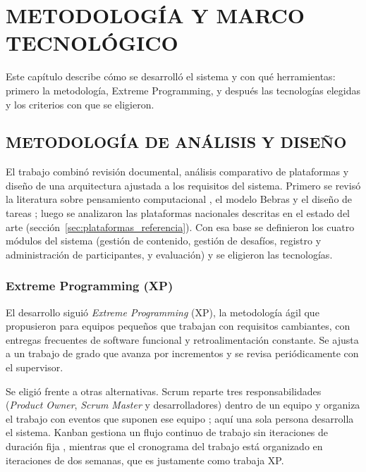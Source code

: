 \chapter{METODOLOGÍA Y MARCO TECNOLÓGICO}

Este capítulo describe cómo se desarrolló el sistema y con qué herramientas: primero la metodología, Extreme Programming, y después las tecnologías elegidas y los criterios con que se eligieron.

\section{METODOLOGÍA DE ANÁLISIS Y DISEÑO}

El trabajo combinó revisión documental, análisis comparativo de plataformas y diseño de una arquitectura ajustada a los requisitos del sistema. Primero se revisó la literatura sobre pensamiento computacional \parencite{wing2006,grover2013}, el modelo Bebras \parencite{dagienestupuriene2016,izumirolo2017} y el diseño de tareas \parencite{dagienefutschek2008}; luego se analizaron las plataformas nacionales descritas en el estado del arte (sección~\ref{sec:plataformas_referencia}). Con esa base se definieron los cuatro módulos del sistema (gestión de contenido, gestión de desafíos, registro y administración de participantes, y evaluación) y se eligieron las tecnologías.

\subsection{Extreme Programming (XP)}

El desarrollo siguió \textit{Extreme Programming} (XP), la metodología ágil que \textcite{beck2004} propusieron para equipos pequeños que trabajan con requisitos cambiantes, con entregas frecuentes de software funcional y retroalimentación constante. Se ajusta a un trabajo de grado que avanza por incrementos y se revisa periódicamente con el supervisor.

Se eligió frente a otras alternativas. Scrum reparte tres responsabilidades (\textit{Product Owner}, \textit{Scrum Master} y desarrolladores) dentro de un equipo y organiza el trabajo con eventos que suponen ese equipo \parencite{schwaber2020}; aquí una sola persona desarrolla el sistema. Kanban gestiona un flujo continuo de trabajo sin iteraciones de duración fija \parencite{anderson2010}, mientras que el cronograma del trabajo está organizado en iteraciones de dos semanas, que es justamente como trabaja XP.


